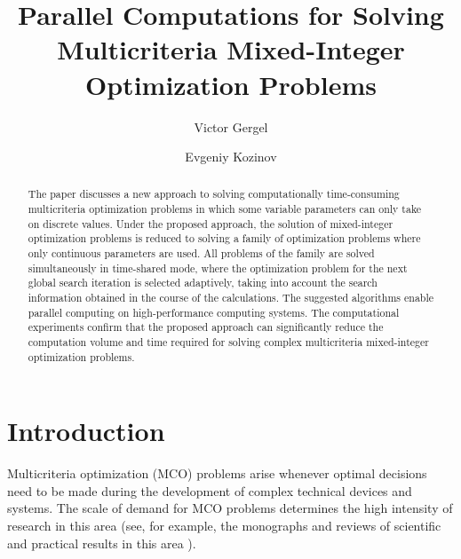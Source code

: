 \documentclass{svproc}
\begin{document}
\title{Parallel Computations for Solving Multicriteria Mixed-Integer Optimization Problems}

\author{Victor Gergel \and Evgeniy Kozinov}


\maketitle              %

\begin{abstract}
The paper discusses a new approach to solving computationally time-consuming multicriteria optimization problems in which some variable parameters can only take on discrete values. Under the proposed approach, the solution of mixed-integer optimization problems is reduced to solving a family of optimization problems where only continuous parameters are used. All problems of the family are solved simultaneously in time-shared mode, where the optimization problem for the next global search iteration is selected adaptively, taking into account the search information obtained in the course of the calculations. The suggested algorithms enable parallel computing on high-performance computing systems. The computational experiments confirm that the proposed approach can significantly reduce the computation volume and time required for solving complex multicriteria mixed-integer optimization problems.

\end{abstract}

\section{Introduction}\label{sec:1}

Multicriteria optimization (MCO) problems arise whenever optimal decisions need to be made during the development of complex technical devices and systems. The scale of demand for MCO problems determines the high intensity of research in this area (see, for example, the monographs \cite{c1,c2,c3,c4,c5} and reviews of scientific and practical results in this area \cite{c6,c7,c8,c9}).
\end{document}
